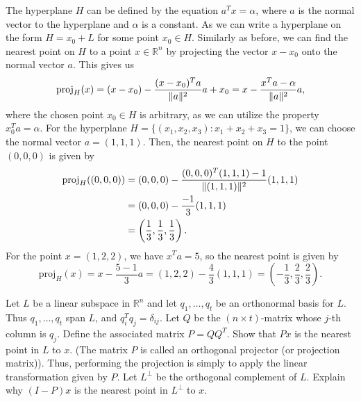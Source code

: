 \begin{solution}
  The hyperplane $H$ can be defined by the equation $a^T x = \alpha$, where $a$ is the normal vector to the hyperplane and $\alpha$ is a constant.
  As we can write a hyperplane on the form $H = x_0 + L$ for some point $x_0 \in H$.
  Similarly as before, we can find the nearest point on $H$ to a point $x \in \mathbb{R}^n$ by projecting the vector $x - x_0$ onto the normal vector $a$.
  This gives us
  \begin{equation}
    \mathrm{proj}_H (x) = (x - x_0) - \frac{(x - x_0)^T a}{\lVert a\rVert^2} a + x_0 = x - \frac{x^T a - \alpha}{\lVert a\rVert^2} a,
  \end{equation}
  where the chosen point $x_0 \in H$ is arbitrary, as we can utilize the property $x_0^T a = \alpha$.
  For the hyperplane $H = \{ (x_1, x_2, x_3) : x_1 + x_2 + x_3 = 1 \}$, we can choose the normal vector $a = (1, 1, 1)$.
  Then, the nearest point on $H$ to the point $(0, 0, 0)$ is given by
  \begin{equation}
    \begin{split}
      \mathrm{proj}_H ((0, 0, 0)) &= (0, 0, 0) - \frac{(0, 0, 0)^T (1, 1, 1) - 1}{\lVert(1, 1, 1)\rVert^2} (1, 1, 1) \\
      &= (0, 0, 0) - \frac{-1}{3} (1, 1, 1) \\
      &= \left(\frac{1}{3}, \frac{1}{3}, \frac{1}{3}\right).
    \end{split}
  \end{equation}
  For the point $x = (1, 2, 2)$, we have $x^T a = 5$, so the nearest point is given by
  \begin{equation}
    \mathrm{proj}_H (x) = x - \frac{5 - 1}{3} a = (1, 2, 2) - \frac{4}{3} (1, 1, 1) = \left(-\frac{1}{3}, \frac{2}{3}, \frac{2}{3}\right).
  \end{equation}
\end{solution}

\begin{exercise}
  Let $L$ be a linear subspace in $\mathbb{R}^n$ and let $q_1, \ldots, q_t$ be an orthonormal basis for $L$.
  Thus $q_1, \ldots, q_t$ span $L$, and $q_i^T q_j = \delta_{ij}$.
  Let $Q$ be the $(n \times t)$-matrix whose $j$-th column is $q_j$.
  Define the associated matrix $P = Q Q^T$.
  Show that $Px$ is the nearest point in $L$ to $x$.
  (The matrix $P$ is called an orthogonal projector (or projection matrix)).
  Thus, performing the projection is simply to apply the linear transformation given by $P$.
  Let $L^\perp$ be the orthogonal complement of $L$.
  Explain why $(I - P)x$ is the nearest point in $L^\perp$ to $x$.
\end{exercise}

